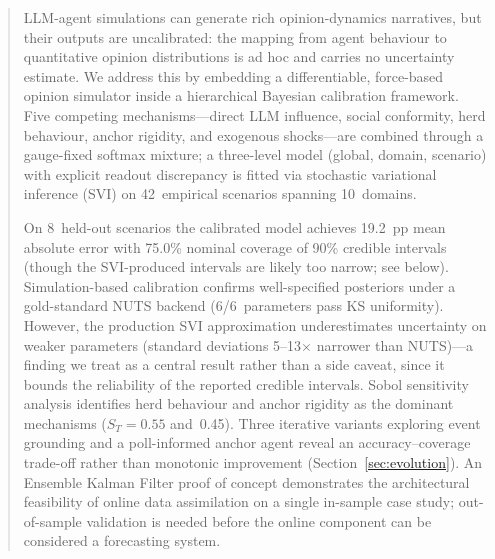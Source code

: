 \documentclass[12pt]{article}
\begin{document}
\begin{abstract}
LLM-agent simulations can generate rich opinion-dynamics narratives, but their outputs are uncalibrated: the mapping from agent behaviour to quantitative opinion distributions is ad hoc and carries no uncertainty estimate. We address this by embedding a differentiable, force-based opinion simulator inside a hierarchical Bayesian calibration framework. Five competing mechanisms---direct LLM influence, social conformity, herd behaviour, anchor rigidity, and exogenous shocks---are combined through a gauge-fixed softmax mixture; a three-level model (global, domain, scenario) with explicit readout discrepancy is fitted via stochastic variational inference (SVI) on 42~empirical scenarios spanning 10~domains.

On 8~held-out scenarios the calibrated model achieves 19.2~pp mean absolute error with 75.0\% nominal coverage of 90\% credible intervals (though the SVI-produced intervals are likely too narrow; see below). Simulation-based calibration confirms well-specified posteriors under a gold-standard NUTS backend (6/6~parameters pass KS uniformity). However, the production SVI approximation underestimates uncertainty on weaker parameters (standard deviations 5--13$\times$ narrower than NUTS)---a finding we treat as a central result rather than a side caveat, since it bounds the reliability of the reported credible intervals. Sobol sensitivity analysis identifies herd behaviour and anchor rigidity as the dominant mechanisms ($S_T = 0.55$ and~0.45). Three iterative variants exploring event grounding and a poll-informed anchor agent reveal an accuracy--coverage trade-off rather than monotonic improvement (Section~\ref{sec:evolution}). An Ensemble Kalman Filter proof of concept demonstrates the architectural feasibility of online data assimilation on a single in-sample case study; out-of-sample validation is needed before the online component can be considered a forecasting system.


\end{abstract}
\end{document}
